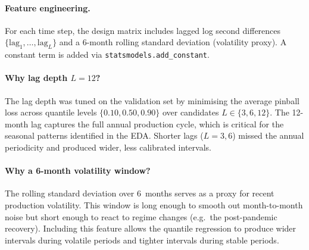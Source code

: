 \documentclass[12pt,a4paper]{article}
\begin{document}
\paragraph{Feature engineering.}
For each time step, the design matrix includes lagged log second differences $\{\text{lag}_1, \ldots, \text{lag}_L\}$ and a 6-month rolling standard deviation (volatility proxy). A constant term is added via \texttt{statsmodels.add\_constant}.

\paragraph{Why lag depth $L = 12$?}
The lag depth was tuned on the validation set by minimising the average pinball loss across quantile levels $\{0.10, 0.50, 0.90\}$ over candidates $L \in \{3, 6, 12\}$. The 12-month lag captures the full annual production cycle, which is critical for the seasonal patterns identified in the EDA. Shorter lags ($L = 3, 6$) missed the annual periodicity and produced wider, less calibrated intervals.

\paragraph{Why a 6-month volatility window?}
The rolling standard deviation over 6~months serves as a proxy for recent production volatility. This window is long enough to smooth out month-to-month noise but short enough to react to regime changes (e.g.\ the post-pandemic recovery). Including this feature allows the quantile regression to produce wider intervals during volatile periods and tighter intervals during stable periods.
\end{document}

